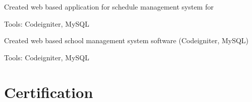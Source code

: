 \documentclass[]{deedy-resume-openfont}
\begin{document}
\begin{minipage}[t]{0.66\textwidth}
\begin{tightemize}
\item Created web based application for schedule management system for 
\item Tools: Codeigniter, MySQL
\end{tightemize}
\sectionsep

\begin{tightemize}
\item Created web based school management system software (Codeigniter, MySQL)
\item Tools: Codeigniter, MySQL
\end{tightemize}
\sectionsep


\section{Certification}
\href{https://www.coursera.org/account/accomplishments/certificate/PB48PJLRP5VQ}{} \\
\href{https://www.datacamp.com/courses/python-data-science-toolbox-part-1}{} \\
\href{https://www.datacamp.com/courses/python-data-science-toolbox-part-2}{} \\
\href{https://www.datacamp.com/courses/exploratory-data-analysis}{} \\
\sectionsep

\end{minipage} 
\end{document}
